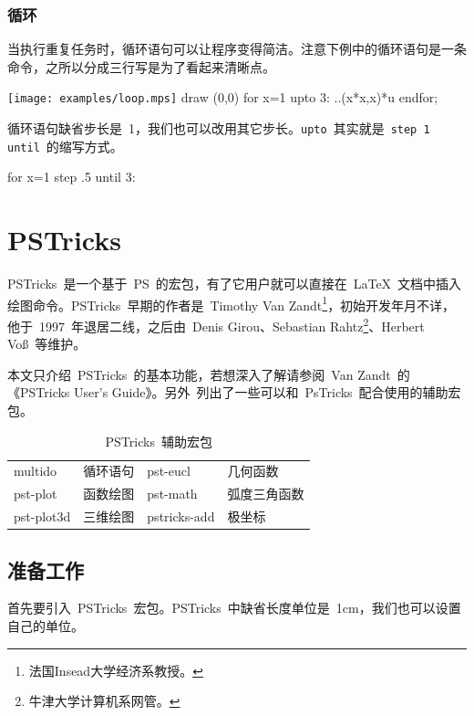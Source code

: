 \subsubsection{循环}
当执行重复任务时，循环语句可以让程序变得简洁。注意下例中的循环语句是一条命令，之所以分成三行写是为了看起来清晰点。

\begin{fdemo}{\texttt{[image: examples/loop.mps]}}
draw (0,0) %
for x=1 upto 3: 
    ..(x*x,x)*u 
endfor;
\end{fdemo}

循环语句缺省步长是~1，我们也可以改用其它步长。\verb|upto|~其实就是~\verb|step 1 until|~的缩写方式。
\begin{code}
for x=1 step .5 until 3: 
\end{code}

\section{PSTricks}
\label{sec:pstricks}

PSTricks~是一个基于~PS~的宏包，有了它用户就可以直接在~\LaTeX~文档中插入绘图命令。PSTricks~早期的作者是~Timothy Van Zandt\footnote{法国Insead大学经济系教授。}，初始开发年月不详，他于~1997~年退居二线，之后由~Denis Girou、Sebastian Rahtz\footnote{牛津大学计算机系网管。}、Herbert Voß~等维护。

本文只介绍~PSTricks~的基本功能，若想深入了解请参阅~Van Zandt~的《PSTricks User's Guide》\citep{Zandt_2007}。另外~列出了一些可以和~PsTricks~配合使用的辅助宏包。

\begin{table}[htbp]
\caption{PSTricks~辅助宏包}
\label{tab:pst_add}
\centering
\begin{tabular}{llll}
    \toprule
    multido & 循环语句    & pst-eucl & 几何函数 \\    
    pst-plot & 函数绘图   & pst-math & 弧度三角函数 \\
    pst-plot3d & 三维绘图 & pstricks-add & 极坐标 \\  
    \bottomrule
\end{tabular}
\end{table}

\subsection{准备工作}
首先要引入~PSTricks~宏包。PSTricks~中缺省长度单位是~1cm，我们也可以设置自己的单位。
\begin{code}
\usepackage{pstricks}
\end{code}

